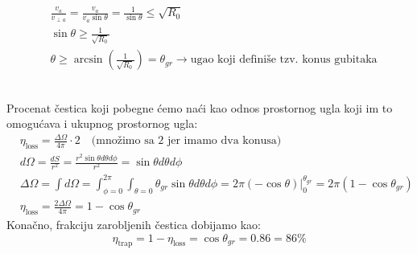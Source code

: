 \documentclass[fleqn]{report}
\begin{document}
\begin{enumerate}
\begin{tikzpicture}
          \end{tikzpicture}
          \hfill\null\\
          \begin{align*}
               & \frac{v_a}{v_{\perp a}} = \frac{v_a}{v_a \sin\theta} = \frac{1}{\sin\theta} \le \sqrt{R_0}                                  \\
               & \sin\theta \ge \frac{1}{\sqrt{R_0}}                                                                                         \\
               & \theta \ge \arcsin\left(\frac{1}{\sqrt{R_0}}\right) = \theta_{gr} \rightarrow \text{ugao koji definiše tzv. konus gubitaka}
          \end{align*}
          \noindent\hfill
          \hfill\null\\
          Procenat čestica koji pobegne ćemo naći kao odnos prostornog ugla koji im to omogućava i ukupnog prostornog ugla:
          \begin{align*}
               & \eta_\text{loss} = \frac{\Delta\Omega}{4\pi} \cdot 2 \quad \text{(množimo sa 2 jer imamo dva konusa)}                                                                                       \\
               & d\Omega = \frac{dS}{r^2} = \frac{r^2 \sin\theta d\theta d\phi}{r^2} = \sin\theta d\theta d\phi                                                                                              \\
               & \Delta \Omega = \int d\Omega = \int_{\phi = 0}^{2\pi} \int_{\theta = 0}{\theta_{gr}} \sin\theta d\theta d\phi = 2\pi \left.(-\cos\theta)\right|_0^{\theta_{gr}} = 2\pi(1 - \cos\theta_{gr}) \\
               & \eta_\text{loss} = \frac{2\Delta\Omega}{4\pi} = 1 - \cos\theta_{gr}
          \end{align*}
          Konačno, frakciju zarobljenih čestica dobijamo kao:
          \[ \eta_\text{trap} = 1 - \eta_\text{loss} = \cos\theta_{gr} = 0.86 = 86\% \]


\end{enumerate}
\end{document}
